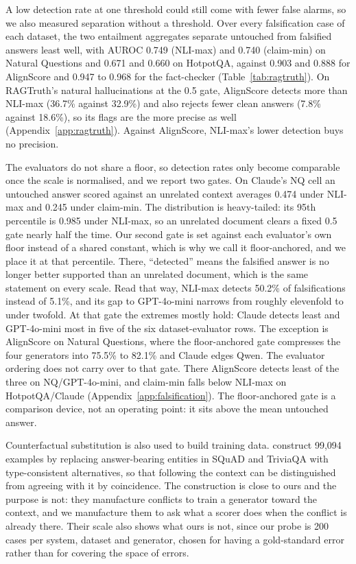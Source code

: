 \documentclass[11pt]{article}
\begin{document}
A low detection rate at one threshold could still come with fewer false alarms, so we also measured separation without a threshold. Over every falsification case of each dataset, the two entailment aggregates separate untouched from falsified answers least well, with AUROC 0.749 (NLI-max) and 0.740 (claim-min) on Natural Questions and 0.671 and 0.660 on HotpotQA, against 0.903 and 0.888 for AlignScore and 0.947 to 0.968 for the fact-checker (Table~\ref{tab:ragtruth}). On RAGTruth's natural hallucinations at the 0.5 gate, AlignScore detects more than NLI-max (36.7\% against 32.9\%) and also rejects fewer clean answers (7.8\% against 18.6\%), so its flags are the more precise as well (Appendix~\ref{app:ragtruth}). Against AlignScore, NLI-max's lower detection buys no precision.

The evaluators do not share a floor, so detection rates only become comparable once the scale is normalised, and we report two gates. On Claude's NQ cell an untouched answer scored against an unrelated context averages 0.474 under NLI-max and 0.245 under claim-min. The distribution is heavy-tailed: its 95th percentile is 0.985 under NLI-max, so an unrelated document clears a fixed 0.5 gate nearly half the time. Our second gate is set against each evaluator's own floor instead of a shared constant, which is why we call it floor-anchored, and we place it at that percentile. There, ``detected'' means the falsified answer is no longer better supported than an unrelated document, which is the same statement on every scale. Read that way, NLI-max detects 50.2\% of falsifications instead of 5.1\%, and its gap to GPT-4o-mini narrows from roughly elevenfold to under twofold. At that gate the extremes mostly hold: Claude detects least and GPT-4o-mini most in five of the six dataset-evaluator rows. The exception is AlignScore on Natural Questions, where the floor-anchored gate compresses the four generators into 75.5\% to 82.1\% and Claude edges Qwen. The evaluator ordering does not carry over to that gate. There AlignScore detects least of the three on NQ/GPT-4o-mini, and claim-min falls below NLI-max on HotpotQA/Claude (Appendix~\ref{app:falsification}). The floor-anchored gate is a comparison device, not an operating point: it sits above the mean untouched answer.



Counterfactual substitution is also used to build training data. \citet{ju-etal-2026} construct 99,094 examples by replacing answer-bearing entities in SQuAD and TriviaQA with type-consistent alternatives, so that following the context can be distinguished from agreeing with it by coincidence. The construction is close to ours and the purpose is not: they manufacture conflicts to train a generator toward the context, and we manufacture them to ask what a scorer does when the conflict is already there. Their scale also shows what ours is not, since our probe is 200 cases per system, dataset and generator, chosen for having a gold-standard error rather than for covering the space of errors.
\end{document}
